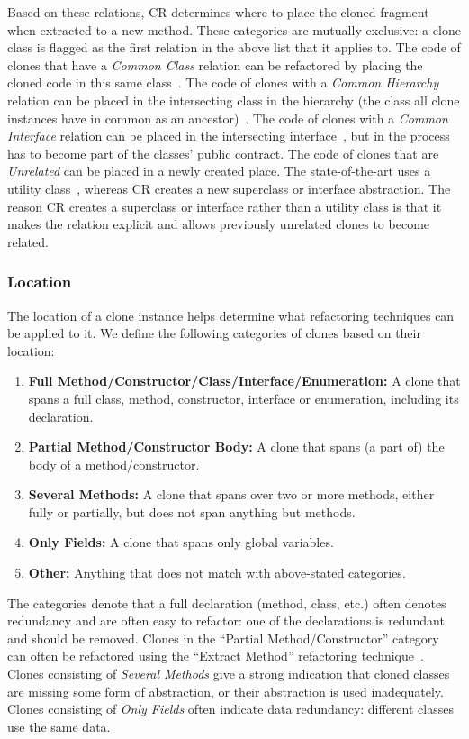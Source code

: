 \documentclass[sigconf,review,anonymous]{acmart}
\begin{document}
Based on these relations, CR determines where to place the cloned fragment when extracted to a new method. These categories are mutually exclusive: a clone class is flagged as the first relation in the above list that it applies to. The code of clones that have a \textit{Common Class} relation can be refactored by placing the cloned code in this same class~\cite{fowler2018refactoring}. The code of clones with a \textit{Common Hierarchy} relation can be placed in the intersecting class in the hierarchy (the class all clone instances have in common as an ancestor)~\cite{fowler2018refactoring}. The code of clones with a \textit{Common Interface} relation can be placed in the intersecting interface~\cite{mohnen2002interfaces}, but in the process has to become part of the classes' public contract. The code of clones that are \textit{Unrelated} can be placed in a newly created place. The state-of-the-art uses a utility class~\cite{mazinanian2016jdeodorant}, whereas CR creates a new superclass or interface abstraction. The reason CR creates a superclass or interface rather than a utility class is that it makes the relation explicit and allows previously unrelated clones to become related.

\subsubsection{Location}\label{sec:location}
The location of a clone instance helps determine what refactoring techniques can be applied to it. We define the following categories of clones based on their location:
\begin{enumerate}
  \item \textbf{Full Method/Constructor/Class/Interface/Enumeration:} A clone that spans a full class, method, constructor, interface or enumeration, including its declaration.
  \item \textbf{Partial Method/Constructor Body:} A clone that spans (a part of) the body of a method/constructor.
  \item \textbf{Several Methods:} A clone that spans over two or more methods, either fully or partially, but does not span anything but methods.
  \item \textbf{Only Fields:} A clone that spans only global variables.
  \item \textbf{Other:} Anything that does not match with above-stated categories.
\end{enumerate}
The categories denote that a full declaration (method, class, etc.) often denotes redundancy and are often easy to refactor: one of the declarations is redundant and should be removed. Clones in the ``Partial Method/Constructor'' category can often be refactored using the ``Extract Method'' refactoring technique~\cite{mazinanian2016jdeodorant}. Clones consisting of \textit{Several Methods} give a strong indication that cloned classes are missing some form of abstraction, or their abstraction is used inadequately. Clones consisting of \textit{Only Fields} often indicate data redundancy: different classes use the same data.
\end{document}
